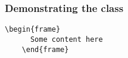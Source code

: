 \documentclass[fragile-frames]{xbeamer}
\begin{document}
\begin{Frame}
  \frametitle{Demonstrating the class}
  \begin{Verbatim}[gobble = 4]
    \begin{frame}
      Some content here
    \end{frame}
  \end{Verbatim}
\end{Frame}
\end{document}
